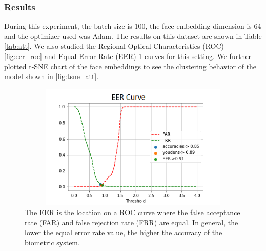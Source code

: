 \documentclass[
12pt,
tightenlines,
aps,
prb,
twocolumn,
superscriptaddress,
longbibliography,
floatfix
]{revtex4-2}
\begin{document}
\subsubsection{Results}
During this experiment, the batch size is 100, the face embedding dimension is 64 and the optimizer used was Adam. The results on this dataset are shown in Table \ref{tab:att}. We also studied the Regional Optical Characteristics (ROC) \ref{fig:eer_roc} and Equal Error Rate (EER) \ref{fig:eer_att} curves for this setting. We further plotted t-SNE chart of the face embeddings to see the clustering behavior of the model shown in \ref{fig:tsne_att}.

\onecolumngrid
\begin{center}    
\begin{figure}[t!]
    \begin{minipage}[b]{0.45\linewidth}
    \centering
    \includegraphics[clip=true,width=1.1\textwidth, height=6cm]{EER_ATT_testdataset.png}
    \caption{The EER is the location on a ROC curve where the false acceptance rate (FAR) and false rejection rate (FRR) are equal. In general, the lower the equal error rate value, the higher the accuracy of the biometric system.}
     \label{fig:eer_att}
     \end{minipage}
     \hspace{0.5cm}
    \begin{minipage}[b]{0.45\linewidth}
    \centering

\end{minipage}
\end{figure}
\end{center}
\end{document}
